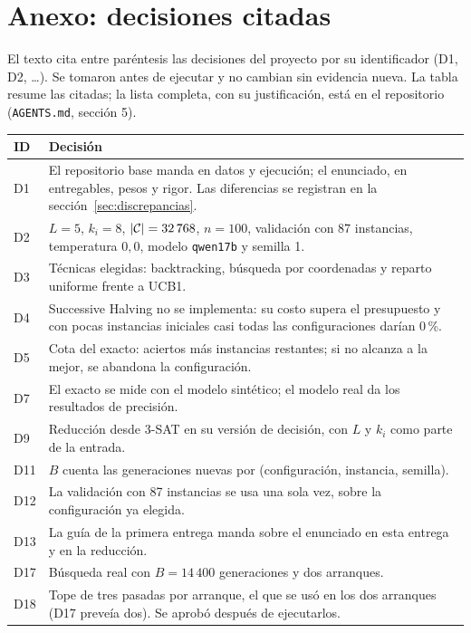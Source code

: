 \section*{Anexo: decisiones citadas}
\label{sec:decisiones}

El texto cita entre paréntesis las decisiones del proyecto por su identificador (D1,
D2, \dots). Se tomaron antes de ejecutar y no cambian sin evidencia nueva. La tabla
resume las citadas; la lista completa, con su justificación, está en el repositorio
(\texttt{AGENTS.md}, sección 5).

\begin{center}
\small
\begin{tabular}{lp{}}
\toprule
ID & Decisión \\
\midrule
D1 & El repositorio base manda en datos y ejecución; el enunciado, en entregables, pesos y
rigor. Las diferencias se registran en la sección~\ref{sec:discrepancias}. \\
D2 & $L=5$, $k_i=8$, $|\mathcal{C}|=32\,768$, $n=100$, validación con 87 instancias,
temperatura $0{,}0$, modelo \texttt{qwen17b} y semilla 1. \\
D3 & Técnicas elegidas: backtracking, búsqueda por coordenadas y reparto uniforme frente a
UCB1. \\
D4 & Successive Halving no se implementa: su costo supera el presupuesto y con pocas
instancias iniciales casi todas las configuraciones darían 0\,\%. \\
D5 & Cota del exacto: aciertos más instancias restantes; si no alcanza a la mejor, se
abandona la configuración. \\
D7 & El exacto se mide con el modelo sintético; el modelo real da los resultados de
precisión. \\
D9 & Reducción desde 3-SAT en su versión de decisión, con $L$ y $k_i$ como parte de la
entrada. \\
D11 & $B$ cuenta las generaciones nuevas por (configuración, instancia, semilla). \\
D12 & La validación con 87 instancias se usa una sola vez, sobre la configuración ya
elegida. \\
D13 & La guía de la primera entrega manda sobre el enunciado en esta entrega y en la
reducción. \\
D17 & Búsqueda real con $B=14\,400$ generaciones y dos arranques. \\
D18 & Tope de tres pasadas por arranque, el que se usó en los dos arranques (D17 preveía
dos). Se aprobó después de ejecutarlos. \\
\bottomrule
\end{tabular}
\end{center}

